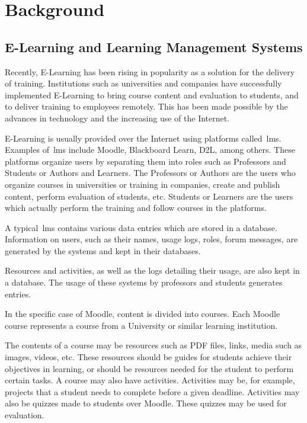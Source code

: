 \chapter{Background}

\section{E-Learning and Learning Management Systems}
\label{sec:elearning_and_lms}

Recently, E-Learning has been rising in popularity as a solution for the
delivery of training. Institutions such as universities and companies have
successfully implemented E-Learning to bring course content and evaluation to
students, and to deliver training to employees remotely. This has been made
possible by the advances in technology and the increasing use of the Internet.

E-Learning is usually provided over the Internet using platforms
called~\gls{lms}. Examples of~\gls{lms} include Moodle, Blackboard Learn, D2L,
among others. These platforms organize users by separating them into roles such
as Professors and Students or Authors and Learners. The Professors or Authors
are the users who organize courses in universities or training in companies,
create and publish content, perform evaluation of students, etc. Students or
Learners are the users which actually perform the training and follow courses
in the platforms.

A typical~\gls{lms} contains various data entries which are stored in a
database. Information on users, such as their names, usage logs, roles, forum
messages, are generated by the systems and kept in their databases.

Resources and activities, as well as the logs detailing their usage, are also
kept in a database. The usage of these systems by professors and students
generates entries.~\cite{ind_010, ind_011, ind_013}

In the specific case of Moodle, content is divided into courses. Each Moodle
course represents a course from a University or similar learning institution.

The contents of a course may be resources such as PDF files, links, media such
as images, videos, etc. These resources should be guides for students achieve
their objectives in learning, or should be resources needed for the student to
perform certain tasks. A course may also have activities. Activities may be,
for example, projects that a student needs to complete before a given deadline.
Activities may also be quizzes made to students over Moodle. These quizzes may
be used for evaluation.

